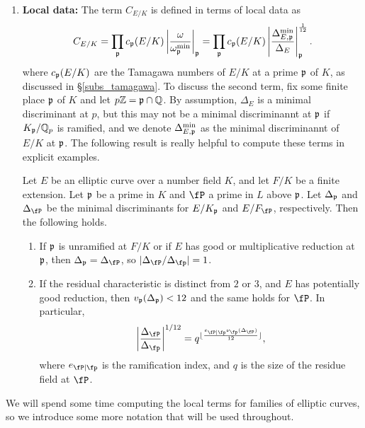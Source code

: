 \begin{enumerate}
    \item \textbf{Local data:} The term $C_{E/K}$ is defined in terms of local data as 
    \begin{equation}\label{fudge-factor}
    C_{E/K}=\prod_{\mathfrak{p}}c_{\mathfrak{p}}(E/K)\left|\frac{\omega}{\omega_{\mathfrak{p}}^{\min}}\right|_{\mathfrak{p}}=\prod_{\mathfrak{p}}c_{\mathfrak{p}}(E/K)\left|\frac{\Delta_{E,\mathfrak{p}}^{\min}}{\Delta_E}\right|_{\mathfrak{p}}^{\frac{1}{12}}.
    \end{equation}
    where $c_{\mathfrak{p}}(E/K)$ are the Tamagawa numbers of $E/K$ at a prime $\mathfrak{p}$ of $K$, as discussed in \S\ref*{subs_tamagawa}. To discuss the second term, fix some finite place $\mathfrak{p}$ of $K$ and let $p\mathbb{Z}=\mathfrak{p}\cap\mathbb{Q}$. By assumption, $\Delta_E$ is a minimal discriminant at $p$, but this may not be a minimal discriminannt at $\mathfrak{p}$ if $K_{\mathfrak{p}}/\mathbb{Q}_p$ is ramified, and we denote $\Delta_{E,\mathfrak{p}}^{\min}$ as the minimal discriminannt of $E/K$ at $\mathfrak{p}$. The following result is really helpful to compute these terms in explicit examples.
    
    \begin{lemma}\label{lem_Dterms}
        Let $E$ be an elliptic curve over a number field $K$, and let $F/K$ be a finite extension. Let $\mathfrak{p}$ be a prime in $K$ and $\fP$ a prime in $L$ above $\mathfrak{p}$. Let $\Delta_{\mathfrak{p}}$ and $\Delta_\fP$ be the minimal discriminants for $E/K_{\mathfrak{p}}$ and $E/F_\fP$, respectively. Then the following holds.
        \begin{enumerate}
            \item If $\mathfrak{p}$ is unramified at $F/K$ or if $E$ has good or multiplicative reduction at $\mathfrak{p}$, then $\Delta_\pp=\Delta_\fP$, so $|\Delta_\fP/\Delta_\fp|=1$.
            \item If the residual characteristic is distinct from $2$ or $3$, and $E$ has potentially good reduction, then $v_{\mathfrak{p}}(\Delta_{\mathfrak{p}})<12$ and the same holds for $\fP$. In particular, 
            $$\left|\frac{\Delta_\fP}{\Delta_\fp}\right|^{1/12}=q^{\floor{\frac{e_{\fP\mid\fp}\nu_\fp(\Delta_\fP)}{12}}},$$
            where $e_{\fP\mid\fp}$ is the ramification index, and $q$ is the size of the residue field at $\fP$.
        \end{enumerate}
    \end{lemma}

\end{enumerate}

We will spend some time computing the local terms for families of elliptic curves, so we introduce some more notation that will be used throughout. 

